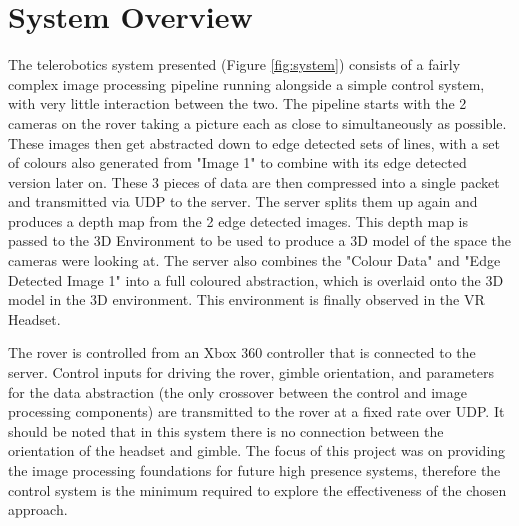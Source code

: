 \chapter{System Overview}
\label{chapter:system}

The telerobotics system presented (Figure \ref{fig:system}) consists of a fairly complex image processing pipeline running alongside a simple control system, with very little interaction between the two. The pipeline starts with the 2 cameras on the rover taking a picture each as close to simultaneously as possible. These images then get abstracted down to edge detected sets of lines, with a set of colours also generated from "Image 1" to combine with its edge detected version later on. These 3 pieces of data are then compressed into a single packet and transmitted via UDP to the server. The server splits them up again and produces a depth map from the 2 edge detected images. This depth map is passed to the 3D Environment to be used to produce a 3D model of the space the cameras were looking at. The server also combines the "Colour Data" and "Edge Detected Image 1" into a full coloured abstraction, which is overlaid onto the 3D model in the 3D environment. This environment is finally observed in the VR Headset.

The rover is controlled from an Xbox 360 controller that is connected to the server. Control inputs for driving the rover, gimble orientation, and parameters for the data abstraction (the only crossover between the control and image processing components) are transmitted to the rover at a fixed rate over UDP. It should be noted that in this system there is no connection between the orientation of the headset and gimble. The focus of this project was on providing the image processing foundations for future high presence systems, therefore the control system is the minimum required to explore the effectiveness of the chosen approach.

